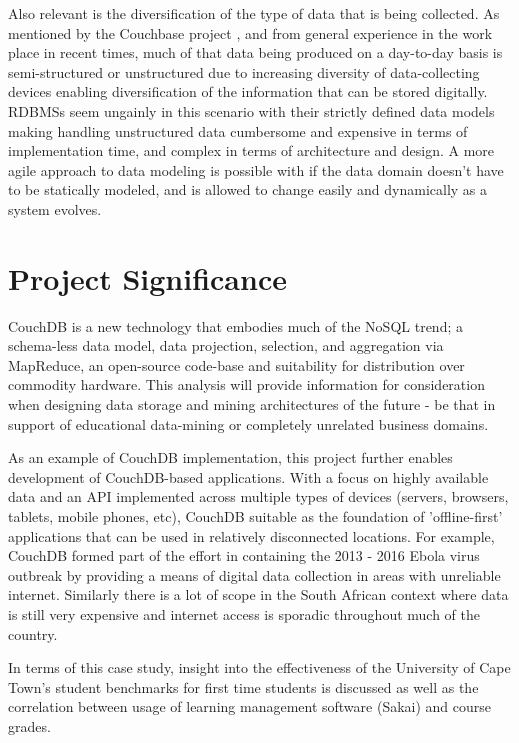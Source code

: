 Also relevant is the diversification of the type of data that is being collected. As mentioned by the Couchbase project \cite{couchbaseWhitePaper}, and from general experience in the work place in recent times, much of that data being produced on a day-to-day basis is semi-structured or unstructured due to increasing diversity of data-collecting devices enabling diversification of the information that can be stored digitally. RDBMSs seem ungainly in this scenario with their strictly defined data models making handling unstructured data cumbersome and expensive in terms of implementation time, and complex in terms of architecture and design. A more agile approach to data modeling is possible with if the data domain doesn't have to be statically modeled, and is allowed to change easily and dynamically as a system evolves.

\section{Project Significance}
CouchDB is a new technology that embodies much of the NoSQL trend; a schema-less data model, data projection, selection, and aggregation via MapReduce, an open-source code-base and suitability for distribution over commodity hardware. This analysis will provide information for consideration when designing data storage and mining architectures of the future - be that in support of educational data-mining or completely unrelated business domains.

As an example of CouchDB implementation, this project further enables development of CouchDB-based applications. With a focus on highly available data and an API implemented across multiple types of devices (servers, browsers, tablets, mobile phones, etc), CouchDB suitable as the foundation of 'offline-first' applications that can be used in relatively disconnected locations. For example, CouchDB formed part of the effort in containing the 2013 - 2016 Ebola virus outbreak \cite{ebola2017} by providing a means of digital data collection in areas with unreliable internet. Similarly there is a lot of scope in the South African context where data is still very expensive and internet access is sporadic throughout much of the country.

In terms of this case study, insight into the effectiveness of the University of Cape Town's student benchmarks for first time students is discussed as well as the correlation between usage of learning management software (Sakai) and course grades.

